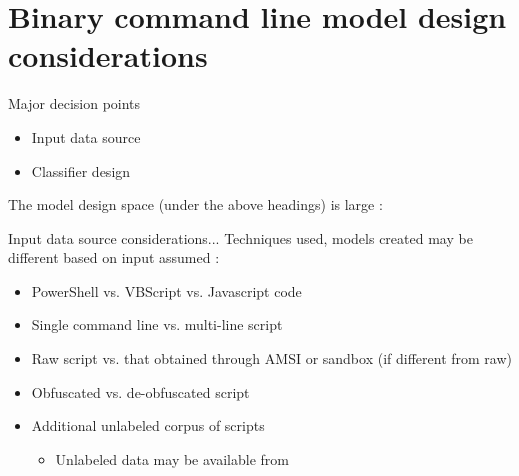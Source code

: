 \documentclass[10pt]{beamer}
\begin{document}
\section{Binary command line model design considerations}

\begin{frame}[fragile]{Major decision points}
	\begin{itemize}
		\item Input data source
		\item Classifier design
	\end{itemize}

	The model design space (under the above headings) is large \cite{survey2021,msft2017,powershell2018,amsi2019,feye2018,feye2018-2,textcnn2016,textcnn2019,transformers2019}:
\end{frame}

\begin{frame}{Input data source considerations...}
	Techniques used, models created may be different based on input assumed \cite{msft2017-2,msft2019,feye2018}:
	\begin{itemize}
		\item PowerShell vs. VBScript vs. Javascript code 
		\item Single command line vs. multi-line script
		\item Raw script vs. that obtained through AMSI or sandbox (if different from raw)
		\item Obfuscated vs. de-obfuscated script
		\item Additional unlabeled corpus of scripts
		\begin{itemize}
			\item Unlabeled data may be available from \cite{data1,data2}
		\end{itemize}
	\end{itemize}
\end{frame}
\end{document}
